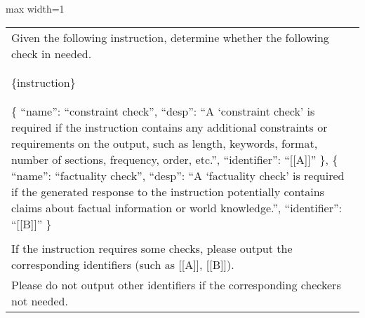 \begin{table*}
    \centering
    \small
    \begin{adjustbox}{max width=1\linewidth}
    {
    \begin{tabular}{p{\linewidth}}
    \toprule
   Given the following instruction, determine whether the following check in needed. \\
    \\
        \text{[Instruction]} \\
        \{instruction\} \\
    \\
        \text{[Checks]} \\
       \{ 
            ``name'': ``constraint check'', 
            ``desp'': ``A `constraint check' is required if the instruction contains any additional constraints or requirements on the output, such as length, keywords, format, number of sections, frequency, order, etc.'', 
            ``identifier'': ``[[A]]'' 
        \}, 
        \{  
            ``name'': ``factuality check'', 
            ``desp'': ``A `factuality check' is required if the generated response to the instruction potentially contains claims about factual information or world knowledge.'', 
            ``identifier'': ``[[B]]'' 
        \} \\
        \\
        If the instruction requires some checks, please output the corresponding identifiers (such as [[A]], [[B]]). \\
        Please do not output other identifiers if the corresponding checkers not needed. \\
    \bottomrule
    \end{tabular}
    }
    \end{adjustbox}
    \caption{Our prompt for the router, where the \{instruction\} part varies based on the input. }
    \label{tab:planner}
\end{table*}

